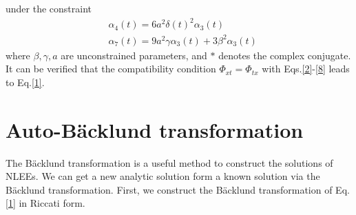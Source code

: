\documentclass[12pt]{article}
\begin{document}
under the constraint
\begin{align}
  & \alpha_{4}(t) = 6a^{2}\delta(t)^{2}\alpha_{3}(t) \\
  & \alpha_{7}(t) = 9a^2\gamma\alpha_3(t) + 3\beta^2\alpha_3(t)
\end{align}
where $\beta, \gamma, a$ are unconstrained parameters, and $*$ denotes the complex conjugate. It can be verified that the compatibility condition $\Phi_{xt} = \Phi_{tx}$ with Eqs.\eqref{2}-\eqref{8} leads to Eq.\eqref{1}.

\section{Auto-B\"acklund transformation}
The B\"acklund transformation is a useful method to construct the solutions of NLEEs. We can get a new analytic solution form a known solution via the B\"acklund transformation\cite{11,14,15,16}. First, we construct the B\"acklund transformation of Eq.\eqref{1} in Riccati form.
\end{document}
